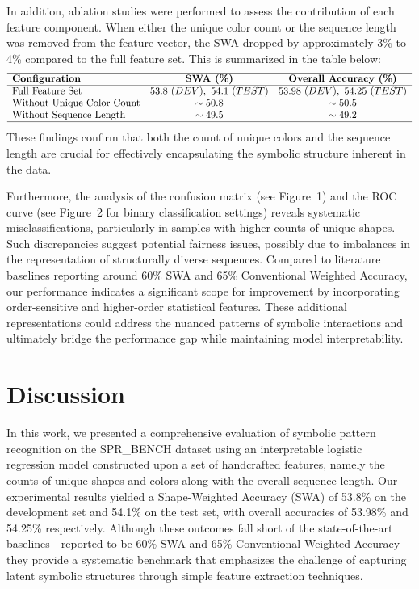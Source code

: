 \documentclass{article}
\begin{document}
In addition, ablation studies were performed to assess the contribution of each feature component. When either the unique color count or the sequence length was removed from the feature vector, the SWA dropped by approximately 3\% to 4\% compared to the full feature set. This is summarized in the table below:
\[
\begin{array}{lcc}
\hline
\textbf{Configuration} & \textbf{SWA (\%)} & \textbf{Overall Accuracy (\%)} \\
\hline
\text{Full Feature Set} & 53.8\ (DEV),\ 54.1\ (TEST) & 53.98\ (DEV),\ 54.25\ (TEST) \\
\text{Without Unique Color Count} & \sim50.8 & \sim50.5 \\
\text{Without Sequence Length} & \sim49.5 & \sim49.2 \\
\hline
\end{array}
\]
These findings confirm that both the count of unique colors and the sequence length are crucial for effectively encapsulating the symbolic structure inherent in the data.

Furthermore, the analysis of the confusion matrix (see Figure~1) and the ROC curve (see Figure~2 for binary classification settings) reveals systematic misclassifications, particularly in samples with higher counts of unique shapes. Such discrepancies suggest potential fairness issues, possibly due to imbalances in the representation of structurally diverse sequences. Compared to literature baselines reporting around 60\% SWA and 65\% Conventional Weighted Accuracy, our performance indicates a significant scope for improvement by incorporating order-sensitive and higher-order statistical features. These additional representations could address the nuanced patterns of symbolic interactions and ultimately bridge the performance gap while maintaining model interpretability.

\section{Discussion}
In this work, we presented a comprehensive evaluation of symbolic pattern recognition on the SPR\_BENCH dataset using an interpretable logistic regression model constructed upon a set of handcrafted features, namely the counts of unique shapes and colors along with the overall sequence length. Our experimental results yielded a Shape-Weighted Accuracy (SWA) of 53.8\% on the development set and 54.1\% on the test set, with overall accuracies of 53.98\% and 54.25\% respectively. Although these outcomes fall short of the state-of-the-art baselines—reported to be 60\% SWA and 65\% Conventional Weighted Accuracy—they provide a systematic benchmark that emphasizes the challenge of capturing latent symbolic structures through simple feature extraction techniques.
\end{document}
